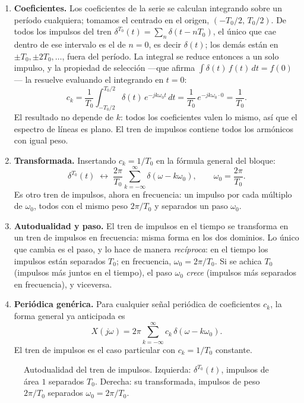\documentclass[10pt,a4paper]{article}
\begin{document}
	\begin{enumerate}[label=\textbf{\alph*)}]
		\item \textbf{Coeficientes.} Los coeficientes de la serie se calculan integrando sobre un período cualquiera; tomamos el centrado en el origen, $(-T_0/2,\,T_0/2)$. De todos los impulsos del tren $\delta^{T_0}(t)=\sum_n\delta(t-nT_0)$, el único que cae dentro de ese intervalo es el de $n=0$, es decir $\delta(t)$; los demás están en $\pm T_0,\pm 2T_0,\dots$, fuera del período. La integral se reduce entonces a un solo impulso, y la propiedad de selección ---que afirma $\int \delta(t)\,f(t)\,dt = f(0)$--- la resuelve evaluando el integrando en $t=0$:
		\[
			c_k = \frac{1}{T_0}\int_{-T_0/2}^{T_0/2}\delta(t)\,e^{-jk\omega_0 t}\,dt = \frac{1}{T_0}\,e^{-jk\omega_0\cdot 0} = \frac{1}{T_0}.
		\]
		El resultado no depende de $k$: todos los coeficientes valen lo mismo, así que el espectro de líneas es plano. El tren de impulsos contiene todos los armónicos con igual peso.

		\item \textbf{Transformada.} Insertando $c_k=1/T_0$ en la fórmula general del bloque:
		\[
			\boxed{\delta^{T_0}(t) \;\leftrightarrow\; \frac{2\pi}{T_0}\sum_{k=-\infty}^{\infty}\delta(\omega-k\omega_0), \qquad \omega_0=\frac{2\pi}{T_0}.}
		\]
		Es otro tren de impulsos, ahora en frecuencia: un impulso por cada múltiplo de $\omega_0$, todos con el mismo peso $2\pi/T_0$ y separados un paso $\omega_0$.

		\item \textbf{Autodualidad y paso.} El tren de impulsos en el tiempo se transforma en un tren de impulsos en frecuencia: misma forma en los dos dominios. Lo único que cambia es el paso, y lo hace de manera \emph{recíproca}: en el tiempo los impulsos están separados $T_0$; en frecuencia, $\omega_0=2\pi/T_0$. Si se achica $T_0$ (impulsos más juntos en el tiempo), el paso $\omega_0$ \emph{crece} (impulsos más separados en frecuencia), y viceversa.

		\item \textbf{Periódica genérica.} Para cualquier señal periódica de coeficientes $c_k$, la forma general ya anticipada es
		\[
			\boxed{X(j\omega) = 2\pi\sum_{k=-\infty}^{\infty} c_k\,\delta(\omega-k\omega_0).}
		\]
		El tren de impulsos es el caso particular con $c_k=1/T_0$ constante.
	\end{enumerate}

	\begin{figure}[H]
		\centering
		
		\caption{Autodualidad del tren de impulsos. Izquierda: $\delta^{T_0}(t)$, impulsos de área $1$ separados $T_0$. Derecha: su transformada, impulsos de peso $2\pi/T_0$ separados $\omega_0=2\pi/T_0$.}
		\label{fig:sol_ej11}
	\end{figure}
\end{document}

